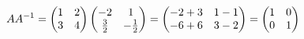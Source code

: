 \documentclass[preview]{standalone}
\begin{document}
\begin{align*}
\special{dvisvgm:raw <g id='unique000'>}AA^{-1}=\begin{pmatrix}1&2\\3&4\end{pmatrix}\begin{pmatrix}-2&1\\\frac{3}{2}&-\frac{1}{2}\end{pmatrix}=\begin{pmatrix}-2+3&1-1\\-6+6&3-2\end{pmatrix}=\begin{pmatrix}1&0\\0&1\end{pmatrix}\special{dvisvgm:raw </g>}
\end{align*}
\end{document}

